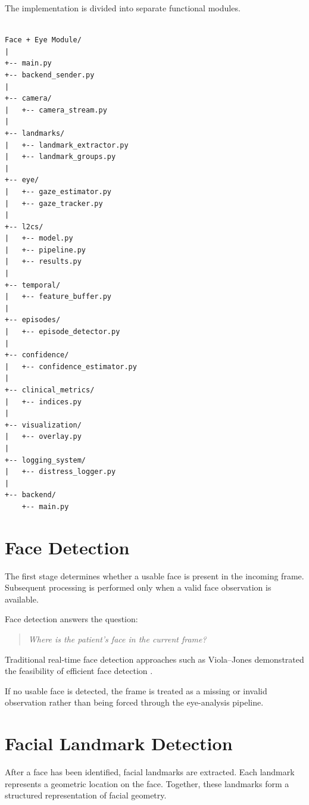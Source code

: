 \documentclass{tietreport}
\begin{document}
The implementation is divided into separate functional modules.

\begin{lstlisting}[caption={Representative project structure}]

Face + Eye Module/
|
+-- main.py
+-- backend_sender.py
|
+-- camera/
|   +-- camera_stream.py
|
+-- landmarks/
|   +-- landmark_extractor.py
|   +-- landmark_groups.py
|
+-- eye/
|   +-- gaze_estimator.py
|   +-- gaze_tracker.py
|
+-- l2cs/
|   +-- model.py
|   +-- pipeline.py
|   +-- results.py
|
+-- temporal/
|   +-- feature_buffer.py
|
+-- episodes/
|   +-- episode_detector.py
|
+-- confidence/
|   +-- confidence_estimator.py
|
+-- clinical_metrics/
|   +-- indices.py
|
+-- visualization/
|   +-- overlay.py
|
+-- logging_system/
|   +-- distress_logger.py
|
+-- backend/
    +-- main.py

\end{lstlisting}


\section{Face Detection}

The first stage determines whether a usable face is present in the
incoming frame. Subsequent processing is performed only when a valid
face observation is available.

Face detection answers the question:

\begin{quote}
\itshape
Where is the patient's face in the current frame?
\end{quote}

Traditional real-time face detection approaches such as Viola--Jones
demonstrated the feasibility of efficient face detection
\cite{VJ04}.

If no usable face is detected, the frame is treated as a missing or
invalid observation rather than being forced through the eye-analysis
pipeline.


\section{Facial Landmark Detection}

After a face has been identified, facial landmarks are extracted. Each
landmark represents a geometric location on the face. Together, these
landmarks form a structured representation of facial geometry.
\end{document}
